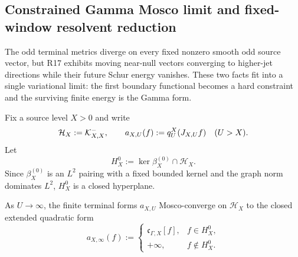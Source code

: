 
\subsection{Constrained Gamma Mosco limit and fixed-window resolvent reduction}
\label{subsec:o3z-constrained-gamma}

The odd terminal metrics diverge on every fixed nonzero smooth odd source vector, but
R17 exhibits moving near-null vectors converging to higher-jet directions while their
future Schur energy vanishes.  These two facts fit into a single variational limit: the
first boundary functional becomes a hard constraint and the surviving finite energy is
the Gamma form.

Fix a source level $X>0$ and write
\[
 \mathcal H_X:=\mathcal K_{X,X}^{-},
 \qquad
 a_{X,U}(f):=q_U^X(J_{X,U}f)
 \quad(U>X).
\]
Let
\[
 H_X^0:=\ker\beta_X^{(0)}\cap\mathcal H_X.
\]
Since $\beta_X^{(0)}$ is an $L^2$ pairing with a fixed bounded kernel and the graph norm
dominates $L^2$, $H_X^0$ is a closed hyperplane.

\begin{theorem}
\label{thm:o3z-mosco}
As $U\to\infty$, the finite terminal forms $a_{X,U}$ Mosco-converge on
$\mathcal H_X$ to the closed extended quadratic form
\[
 \boxed{
 a_{X,\infty}(f)
 :=
 \begin{cases}
 \mathfrak c_{\Gamma,X}[f],&f\in H_X^0,\\[2pt]
 +\infty,&f\notin H_X^0.
 \end{cases}
 }
\tag{O3Z.1}\label{eq:o3z-limit-form}
\]
\end{theorem}

